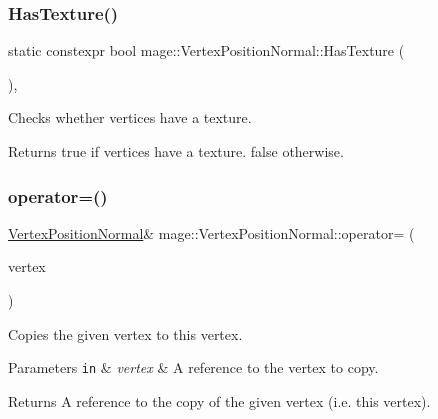 \subsubsection{\texorpdfstring{Has\+Texture()}{HasTexture()}}
{\footnotesize\ttfamily static constexpr bool mage\+::\+Vertex\+Position\+Normal\+::\+Has\+Texture (\begin{DoxyParamCaption}{ }\end{DoxyParamCaption})\hspace{0.3cm}{\ttfamily [static]}, {\ttfamily [noexcept]}}

Checks whether vertices have a texture.

\begin{DoxyReturn}{Returns}
{\ttfamily true} if vertices have a texture. {\ttfamily false} otherwise. 
\end{DoxyReturn}
\hypertarget{structmage_1_1_vertex_position_normal_a43c666c745b5807afddf87049ace0ef1}{}\label{structmage_1_1_vertex_position_normal_a43c666c745b5807afddf87049ace0ef1} 
\subsubsection{\texorpdfstring{operator=()}{operator=()}\hspace{0.1cm}{\footnotesize\ttfamily [1/2]}}
{\footnotesize\ttfamily \hyperlink{structmage_1_1_vertex_position_normal}{Vertex\+Position\+Normal}\& mage\+::\+Vertex\+Position\+Normal\+::operator= (\begin{DoxyParamCaption}\item[{const \hyperlink{structmage_1_1_vertex_position_normal}{Vertex\+Position\+Normal} \&}]{vertex }\end{DoxyParamCaption})\hspace{0.3cm}{\ttfamily [default]}}

Copies the given vertex to this vertex.


\begin{DoxyParams}[1]{Parameters}
\mbox{\tt in}  & {\em vertex} & A reference to the vertex to copy. \\
\hline
\end{DoxyParams}
\begin{DoxyReturn}{Returns}
A reference to the copy of the given vertex (i.\+e. this vertex). 
\end{DoxyReturn}
\hypertarget{structmage_1_1_vertex_position_normal_acd4c5c78fba38ea8ea61f8d508ce10a3}{}\label{structmage_1_1_vertex_position_normal_acd4c5c78fba38ea8ea61f8d508ce10a3} 
